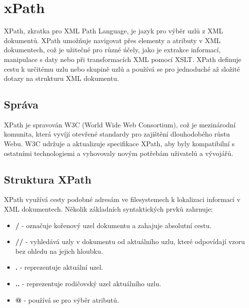 \chapter{xPath}
\label{cha:xPath}

XPath, zkratka pro XML Path Language, je jazyk pro výběr uzlů z XML dokumentů. XPath umožňuje navigovat přes elementy a atributy v XML dokumentech, což je užitečné pro různé účely, jako je extrakce informací, manipulace s daty nebo při transformacích XML pomocí XSLT. XPath definuje cestu k určitému uzlu nebo skupině uzlů a používá se pro jednoduché až složité dotazy na strukturu XML dokumentu.

\section{Správa}
\label{sec:xPath_spr}
XPath je spravován W3C (World Wide Web Consortium), což je mezinárodní komunita, která vyvíjí otevřené standardy pro zajištění dlouhodobého růstu Webu. W3C udržuje a aktualizuje specifikace XPath, aby byly kompatibilní s ostatními technologiemi a vyhovovaly novým potřebám uživatelů a vývojářů.

\section{Struktura XPath}
XPath využívá cesty podobné adresám ve filesystemech k lokalizaci informací v XML dokumentech. Několik základních syntaktických prvků zahrnuje:

\begin{itemize}
  \item \textbf{/} - označuje kořenový uzel dokumentu a zahajuje absolutní cestu.
  \item \textbf{//} - vyhledává uzly v dokumentu od aktuálního uzlu, které odpovídají vzoru bez ohledu na jejich hloubku.
  \item \textbf{.} - reprezentuje aktuální uzel.
  \item \textbf{..} - reprezentuje rodičovský uzel aktuálního uzlu.
  \item \textbf{@} - používá se pro výběr atributů.
\end{itemize}
